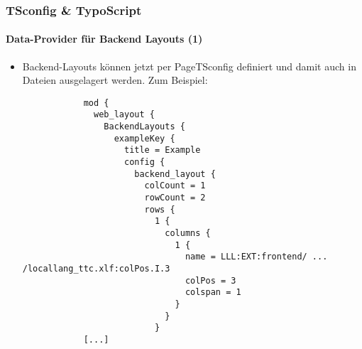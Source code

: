 %

\begin{frame}[fragile]
	\frametitle{TSconfig \& TypoScript}
	\framesubtitle{Data-Provider für Backend Layouts (1)}

	\lstset{basicstyle=\tiny\ttfamily}

	\begin{itemize}
		\item Backend-Layouts können jetzt per PageTSconfig definiert und damit auch in Dateien ausgelagert werden. Zum Beispiel:

		\begin{lstlisting}
			mod {
			  web_layout {
			    BackendLayouts {
			      exampleKey {
			        title = Example
			        config {
			          backend_layout {
			            colCount = 1
			            rowCount = 2
			            rows {
			              1 {
			                columns {
			                  1 {
			                    name = LLL:EXT:frontend/ ... /locallang_ttc.xlf:colPos.I.3
			                    colPos = 3
			                    colspan = 1
			                  }
			                }
			              }
			[...]
		\end{lstlisting}

	\end{itemize}

\end{frame}


